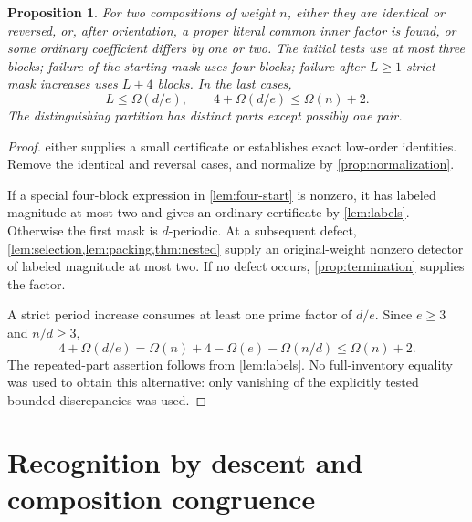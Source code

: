 \documentclass[11pt,a4paper]{amsart}
\numberwithin{equation}{section}
\theoremstyle{plain}
\newtheorem{proposition}[theorem]{Proposition}
\theoremstyle{definition}
\begin{document}
\begin{proposition}\label{prop:local-alternative}
For two compositions of weight \(n\), either they are identical or reversed,
or, after orientation, a proper literal common inner factor is found,
or some ordinary coefficient differs by one or two.  The initial tests
use at most three blocks; failure of the starting mask uses four blocks;
failure after \(L\ge1\) strict mask increases uses \(L+4\) blocks.
In the last cases,
\begin{equation}\label{eq:coarse-local-budget}
L\le\Omega(d/e),\qquad
4+\Omega(d/e)\le\Omega(n)+2.
\end{equation}
The distinguishing partition has distinct parts except possibly one pair.
\end{proposition}
\begin{proof}
 either supplies a small certificate or establishes exact
low-order identities.  Remove the identical and reversal cases, and
normalize by \cref{prop:normalization}.

If a special four-block expression in \cref{lem:four-start} is nonzero,
it has labeled magnitude at most two and gives an ordinary certificate
by \cref{lem:labels}.  Otherwise the first mask is \(d\)-periodic.
At a subsequent defect, \cref{lem:selection,lem:packing,thm:nested}
supply an original-weight nonzero detector of labeled magnitude at most
two.  If no defect occurs, \cref{prop:termination} supplies the factor.

A strict period increase consumes at least one prime factor of \(d/e\).
Since \(e\ge3\) and \(n/d\ge3\),
\[
4+\Omega(d/e)=\Omega(n)+4-\Omega(e)-\Omega(n/d)
\le\Omega(n)+2.
\]
The repeated-part assertion follows from \cref{lem:labels}.
No full-inventory equality was used to obtain this alternative: only
vanishing of the explicitly tested bounded discrepancies was used.
\end{proof}

\section{Recognition by descent and composition congruence}\label{sec:recognition}
\end{document}
